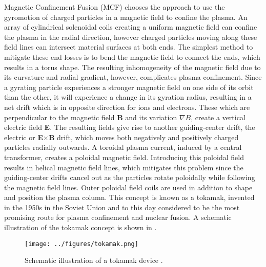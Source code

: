 Magnetic Confinement Fusion (MCF) chooses the approach to use the gyromotion of charged
particles in a magnetic field to confine the plasma. An array of cylindrical solenoidal
coils creating a uniform magnetic field can confine the plasma in the radial direction,
however charged particles moving along these field lines can intersect material surfaces
at both ends. The simplest method to mitigate these end losses is to bend the magnetic
field to connect the ends, which results in a torus shape. The resulting inhomogeneity
of the magnetic field due to its curvature and radial gradient, however, complicates
plasma confinement. Since a gyrating particle experiences a stronger magnetic field on
one side of its orbit than the other, it will experience a change in its gyration
radius, resulting in a net drift which is in opposite direction for ions and electrons.
These  which are perpendicular to the magnetic field
\textbf{B} and its variation $\nabla B$, create a vertical electric field \textbf{E}.
The resulting fields give rise to another guiding-center drift, the electric or
\textbf{E}$\times$\textbf{B} drift, which moves both negatively and positively charged
particles radially outwards. A toroidal plasma current, induced by a central
transformer, creates a poloidal magnetic field. Introducing this poloidal field results
in helical magnetic field lines, which mitigates this problem since the guiding-center
drifts cancel out as the particles rotate poloidally while following the magnetic field
lines. Outer poloidal field coils are used in addition to shape and position the plasma
column. This concept is known as a tokamak, invented in the 1950s in the Soviet Union
and to this day considered to be the most promising route for plasma confinement and
nuclear fusion. A schematic illustration of the tokamak concept is shown in
.
\begin{figure}[t]
  \centering
  \texttt{[image: ../figures/tokamak.png]}
  \caption{Schematic illustration of a tokamak device \cite{eurofusion}.}
  \label{Fig:tokamak}
\end{figure}

